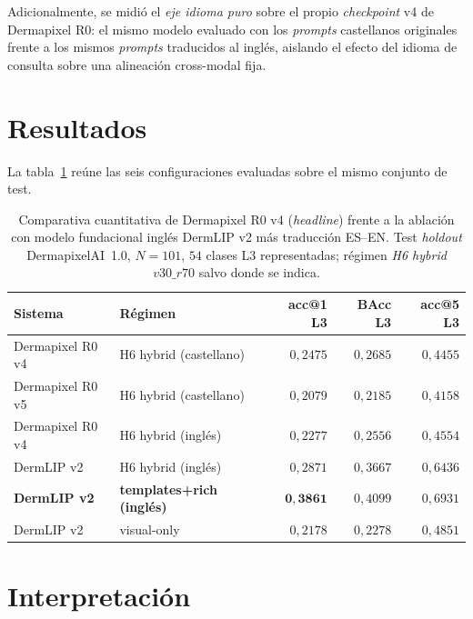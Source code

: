 Adicionalmente, se midió el \emph{eje idioma puro} sobre el propio
\emph{checkpoint} v4 de Dermapixel R0: el mismo modelo evaluado con
los \emph{prompts} castellanos originales frente a los mismos
\emph{prompts} traducidos al inglés, aislando el efecto del idioma
de consulta sobre una alineación cross-modal fija.

\section{Resultados}
\label{sec:anexoi-resultados}

La tabla~\ref{tab:ablation_panderm_en} reúne las seis
configuraciones evaluadas sobre el mismo conjunto de test.

\begin{table}[H]
\centering
\footnotesize
\setlength{\tabcolsep}{4pt}
\renewcommand{\arraystretch}{0.95}
\caption{Comparativa cuantitativa de Dermapixel R0 v4 (\emph{headline})
frente a la ablación con modelo fundacional inglés DermLIP v2 más
traducción ES--EN. Test \emph{holdout} DermapixelAI~1.0,
$N = 101$, $54$ clases L3 representadas; régimen \emph{H6 hybrid}
$v30\_r70$ salvo donde se indica.}
\label{tab:ablation_panderm_en}
\begin{tabular}{llrrr}
\hline
Sistema & Régimen & acc@1 L3 & BAcc L3 & acc@5 L3 \\
\hline
Dermapixel R0 v4    & H6 hybrid (castellano)            & $0{,}2475$          & $0{,}2685$ & $0{,}4455$ \\
Dermapixel R0 v5    & H6 hybrid (castellano)            & $0{,}2079$          & $0{,}2185$ & $0{,}4158$ \\
Dermapixel R0 v4    & H6 hybrid (inglés)              & $0{,}2277$          & $0{,}2556$ & $0{,}4554$ \\
DermLIP v2          & H6 hybrid (inglés)              & $0{,}2871$          & $0{,}3667$ & $0{,}6436$ \\
\textbf{DermLIP v2} & \textbf{templates+rich (inglés)} & $\mathbf{0{,}3861}$ & $0{,}4099$ & $0{,}6931$ \\
DermLIP v2          & visual-only                     & $0{,}2178$          & $0{,}2278$ & $0{,}4851$ \\
\hline
\end{tabular}
\end{table}

\section{Interpretación}
\label{sec:anexoi-interpretacion}

